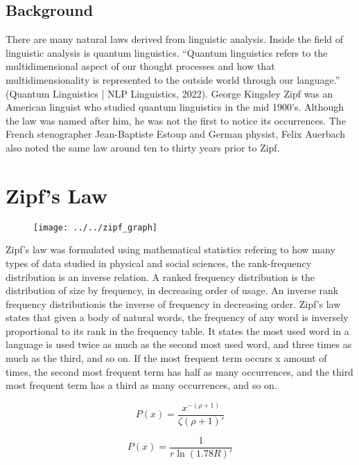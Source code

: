 \documentclass[a4paper,10pt]{article}
\begin{document}
\subsection{Background}
There are many natural laws derived from linguistic analysis. Inside the field of linguistic analysis is quantum linguistics. “Quantum linguistics refers to the multidimensional aspect of our thought processes and how that multidimensionality is represented to the outside world through our language.” (Quantum Linguistics | NLP Linguistics, 2022). George Kingsley Zipf was an American linguist who studied quantum linguistics in the mid 1900’s. Although the law was named after him, he was not the first to notice its occurrences. The French stenographer Jean-Baptiste Estoup and German physist, Felix Auerbach also noted the same law around ten to thirty years prior to Zipf.  

\section{Zipf's Law}

\begin{figure}
	\centering
	\texttt{[image: ../../zipf\_graph]}
	\caption[A perfect example of what Zipf's law would look like on a graph]{}
	\label{fig:zipfgraph}
\end{figure}

Zipf’s law was formulated using mathematical statistics refering to how many types of data studied in  physical and social sciences, the rank-frequency distribution is an inverse relation. A ranked frequency distribution is the distribution of size by frequency, in decreasing order of usage. An inverse rank frequency distributionis the inverse of frequency in decreasing order. Zipf's law states that given a body of natural words, the frequency of any word is inversely proportional to its rank in the frequency table. It states the most used word in a language is used twice as much as the second most used word, and three times as much as the third, and so on. If the most frequent term occurs x amount of times, the second most frequent term has half as many occurrences, and the third most frequent term has a third as many occurrences, and so on. 

\begin{equation}
  P(x) = \frac{x^{-(\rho+1)}}{\zeta (\rho + 1)'}
\end{equation}

\begin{equation}
  P(x) = \frac{1}{r \ln(1.78 R)'}
\end{equation}
\end{document}
